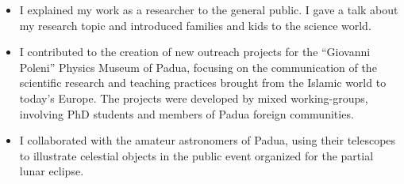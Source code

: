 %
%
%


\begin{experiences}
     {}{
     \begin{itemize}
         \item I explained my work as a researcher to the general public. I gave a talk about my research topic and introduced families and kids to the science world.
     \end{itemize}}
    \emptySeparator
     {}{
     \begin{itemize}
         \item I contributed to the creation of new outreach projects for the ``Giovanni Poleni'' Physics Museum of Padua, focusing on the communication of the scientific research and teaching practices brought from the Islamic world to today's Europe. The projects were developed by mixed working-groups, involving PhD students and members of Padua foreign communities.
     \end{itemize}}
    \emptySeparator
     {}{
     \begin{itemize}
         \item I collaborated with the amateur astronomers of Padua, using their telescopes to illustrate celestial objects in the public event organized for the partial lunar eclipse.
     \end{itemize}}
\end{experiences}